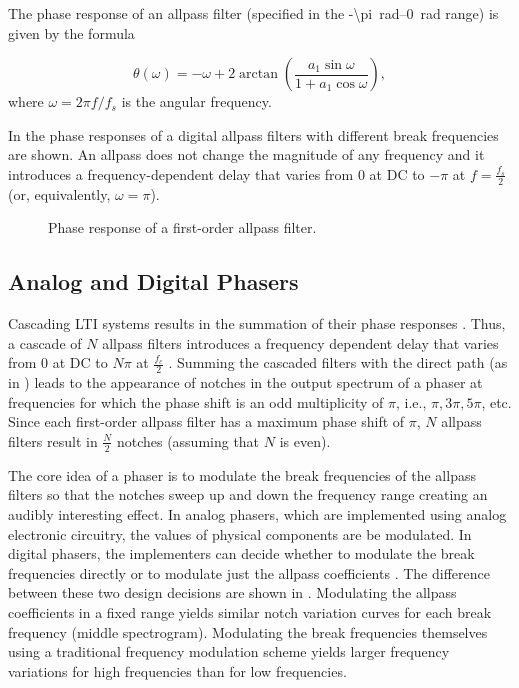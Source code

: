 
The phase response of an allpass filter (specified in the \SIrange{-\pi}{0}{rad} range) is given by the formula \cite{Kiiski2016}

\begin{equation}
    \theta (\omega) = - \omega + 2 \arctan \left( \frac{a_1 \sin \omega}{1 + a_1 \cos \omega} \right),
\end{equation}
where $\omega = 2 \pi f / f_s$ is the angular frequency.

In  the phase responses of a digital allpass filters with different break frequencies are shown. An allpass does not change the magnitude of any frequency and it introduces a frequency-dependent delay that varies from 0 at DC to $-\pi$ at $f = \frac{f_s}{2}$ (or, equivalently, $\omega = \pi$). 

\begin{figure}
    \centering
    
    \caption{Phase response of a first-order allpass filter.}
    \label{fig:phase_response_allpass_filter}
\end{figure}

\subsection{Analog and Digital Phasers}

Cascading \ac{LTI} systems results in the summation of their phase responses \cite{Oppenheim1997}. Thus, a cascade of $N$ allpass filters introduces a frequency dependent delay that varies from 0 at DC to $N\pi$ at $\frac{f_c}{2}$ \cite{PASPWEB2010}. Summing the cascaded filters with the direct path (as in ) leads to the appearance of notches in the output spectrum of a phaser at frequencies for which the phase shift is an odd multiplicity of $\pi$, i.e., $\pi, 3\pi, 5\pi$, etc. Since each first-order allpass filter has a maximum phase shift of $\pi$, $N$ allpass filters result in $\frac{N}{2}$ notches (assuming that $N$ is even).

The core idea of a phaser is to modulate the break frequencies of the allpass filters so that the notches sweep up and down the frequency range creating an audibly interesting effect. In analog phasers, which are implemented using analog electronic circuitry, the values of physical components are be modulated. In digital phasers, the implementers can decide whether to modulate the break frequencies directly or to modulate just the allpass coefficients \cite{Kiiski2016}. The difference between these two design decisions are shown in . Modulating the allpass coefficients in a fixed range yields similar notch variation curves for each break frequency (middle spectrogram). Modulating the break frequencies themselves using a traditional frequency modulation scheme yields larger frequency variations for high frequencies than for low frequencies.

